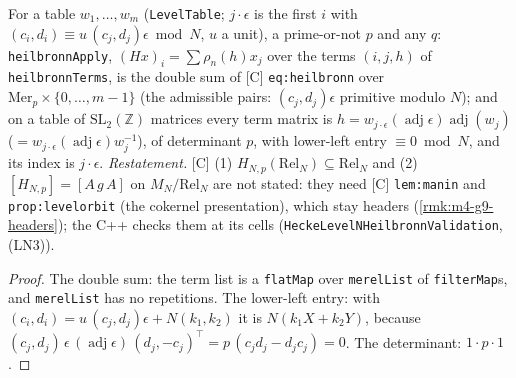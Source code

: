 \begin{proposition}\label{prop:heilbronn-model}
  \leanok
  For a table $w_1,\dots,w_m$ (\texttt{LevelTable}; $j\cdot\epsilon$ is the first $i$ with $(c_i,d_i)\equiv u\,(c_j,d_j)\epsilon\bmod N$,
  $u$ a unit), a prime-or-not $p$ and any $q$: \texttt{heilbronnApply}, $(Hx)_i=\sum\rho_n(h)x_j$ over the terms $(i,j,h)$ of
  \texttt{heilbronnTerms}, is the double sum of [C] \texttt{eq:heilbronn} over $\mathrm{Mer}_p\times\{0,\dots,m-1\}$ (the admissible pairs:
  $(c_j,d_j)\epsilon$ primitive modulo $N$); and on a table of $\mathrm{SL}_2(\mathbb Z)$ matrices every term matrix is
  $h=w_{j\cdot\epsilon}(\operatorname{adj}\epsilon)\operatorname{adj}(w_j)$ ($=w_{j\cdot\epsilon}(\operatorname{adj}\epsilon)w_j^{-1}$), of determinant
  $p$, with lower-left entry $\equiv0\bmod N$, and its index is $j\cdot\epsilon$.
  \emph{Restatement.} [C] (1) $H_{N,p}(\mathrm{Rel}_N)\subseteq\mathrm{Rel}_N$ and (2) $[H_{N,p}]=[A\,g\,A]$ on $M_N/\mathrm{Rel}_N$ are not
  stated: they need [C] \texttt{lem:manin} and \texttt{prop:levelorbit} (the cokernel presentation), which stay headers
  (\ref{rmk:m4-g9-headers}); the C++ checks them at its cells (\texttt{HeckeLevelNHeilbronnValidation}, (LN3)).
\end{proposition}
\begin{proof}
  \leanok
  The double sum: the term list is a \texttt{flatMap} over \texttt{merelList} of \texttt{filterMap}s, and \texttt{merelList} has no
  repetitions. The lower-left entry: with $(c_i,d_i)=u\,(c_j,d_j)\epsilon+N(k_1,k_2)$ it is $N(k_1X+k_2Y)$, because
  $(c_j,d_j)\,\epsilon\,(\operatorname{adj}\epsilon)\,(d_j,-c_j)^{\top}=p\,(c_jd_j-d_jc_j)=0$. The determinant: $1\cdot p\cdot1$.
\end{proof}

